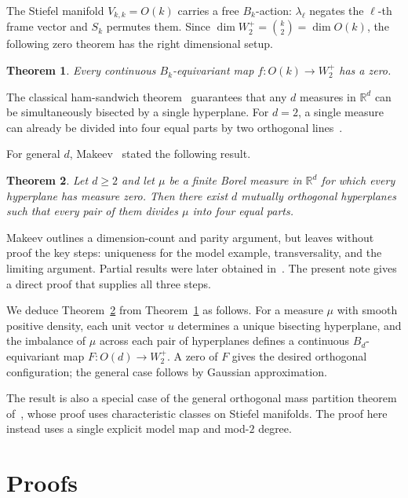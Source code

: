 \documentclass[12pt]{article}
\newtheorem{thm}{Theorem}[section]
\begin{document}
\medskip

The Stiefel manifold $V_{k,k}=O(k)$ carries a free $B_k$-action:
$\lambda_\ell$ negates the $\ell$-th frame vector and $S_k$
permutes them.  Since $\dim W_2^+=\binom{k}{2}=\dim O(k)$,
the following zero theorem has the right dimensional setup.

\begin{thm}\label{main}
Every continuous $B_k$-equivariant map $f:O(k)\to W_2^+$ has a zero.
\end{thm}

\medskip

The classical ham-sandwich theorem~\cite{ST} guarantees that any
$d$ measures in $\mathbb{R}^d$ can be simultaneously bisected by a
single hyperplane.  For $d=2$, a single measure can already be
divided into four equal parts by two orthogonal lines~\cite{Shashkin}.

For general $d$, Makeev~\cite{Mak07} stated the following result.

\begin{thm}\label{mak}
Let $d\ge2$ and let $\mu$ be a finite Borel measure in $\mathbb{R}^d$
for which every hyperplane has measure zero.  Then there exist $d$
mutually orthogonal hyperplanes such that every pair of them divides
$\mu$ into four equal parts.
\end{thm}

Makeev outlines a dimension-count and parity argument, but leaves
without proof the key steps: uniqueness for the model example,
transversality, and the limiting argument.
Partial results were later obtained in~\cite{BK12,Mejia25}.
The present note gives a direct proof that supplies all three steps.

We deduce Theorem~\ref{mak} from Theorem~\ref{main} as follows.
For a measure $\mu$ with smooth positive density, each unit vector
$u$ determines a unique bisecting hyperplane, and the imbalance
of $\mu$ across each pair of hyperplanes defines a continuous
$B_d$-equivariant map $F:O(d)\to W_2^+$.
A zero of $F$ gives the desired orthogonal configuration;
the general case follows by Gaussian approximation.

The result is also a special case of the general orthogonal mass
partition theorem of~\cite{Mus26}, whose proof uses characteristic
classes on Stiefel manifolds.  The proof here instead uses a single
explicit model map and mod-$2$ degree.

\section{Proofs}
\end{document}
